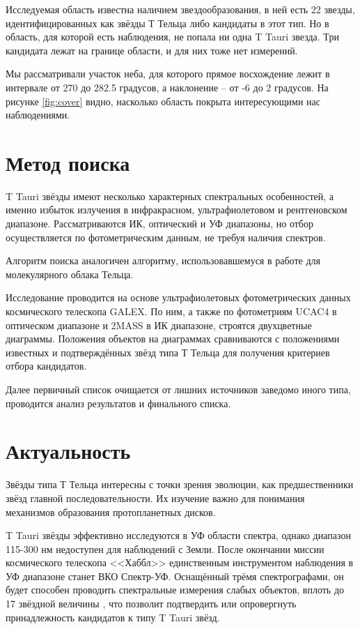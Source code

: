 Исследуемая область известна наличием звездообразования, в ней есть 22 звезды, идентифицированных как звёзды Т Тельца либо кандидаты в этот тип. Но в область, для которой есть наблюдения, не попала ни одна T Tauri звезда. Три кандидата лежат на границе области, и для них тоже нет измерений.

Мы рассматривали участок неба, для которого прямое восхождение лежит в интервале от 270 до 282.5 градусов, а наклонение -- от -6 до 2 градусов. На рисунке \ref{fig:cover} видно, насколько область покрыта интересующими нас наблюдениями.

\section{Метод поиска}
T Tauri звёзды имеют несколько характерных спектральных особенностей, а именно избыток излучения в инфракрасном, ультрафиолетовом и рентгеновском диапазоне. Рассматриваются ИК, оптический и УФ диапазоны, но отбор осуществляется по фотометрическим данным, не требуя наличия спектров.

Алгоритм поиска аналогичен алгоритму, использовавшемуся в работе \cite{AIGdC2014galex} для молекулярного облака Тельца.

Исследование проводится на основе ультрафиолетовых фотометрических данных космического телескопа GALEX. По ним, а также по фотометриям UCAC4 в оптическом диапазоне и 2MASS в ИК диапазоне, строятся двухцветные диаграммы. Положения объектов на диаграммах сравниваются с положениями известных и подтверждённых звёзд типа Т Тельца для получения критериев отбора кандидатов.

Далее первичный список очищается от лишних источников заведомо иного типа, проводится анализ результатов и финального списка.

\section{Актуальность}
Звёзды типа Т Тельца интересны с точки зрения эволюции, как предшественники звёзд главной последовательности. Их изучение важно для понимания механизмов образования протопланетных дисков.


T Tauri звёзды эффективно исследуются в УФ области спектра, однако диапазон 115-300 нм недоступен для наблюдений с Земли.
После окончании миссии космического телескопа <<Хаббл>> единственным инструментом наблюдения в УФ диапазоне станет ВКО Спектр-УФ. Оснащённый трёмя спектрографами, он будет способен проводить спектральные измерения слабых объектов, вплоть до 17 звёздной величины \cite{malkov2011scientific}, что позволит подтвердить или опровергнуть принадлежность кандидатов к типу T Tauri звёзд.

